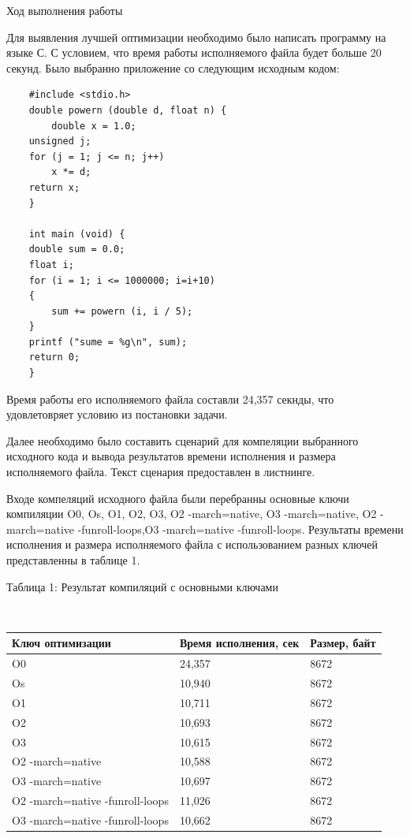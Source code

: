\documentclass[12pt,a4paper]{scrartcl}
\begin{document}
\newpage
\begin{center}
    {\LARGE Ход выполнения работы}
\end{center}
\par
Для выявления лучшей оптимизации необходимо было написать программу на языке С.
 С условием, что время работы исполняемого файла будет больше 20 секунд.
Было выбранно приложение со следующим исходным кодом:

\begin{verbatim}
    #include <stdio.h>
    double powern (double d, float n) {
        double x = 1.0;
	unsigned j;
	for (j = 1; j <= n; j++)
	    x *= d;
	return x;
    }

    int main (void) {
	double sum = 0.0;
	float i;
	for (i = 1; i <= 1000000; i=i+10)
	{
	    sum += powern (i, i / 5);
	}
	printf ("sume = %g\n", sum);
	return 0;
    }
\end{verbatim}
Время работы его исполняемого файла составли 24,357 секнды, что удовлетовряет условию из постановки задачи.
\par
Далее необходимо было составить сценарий для компеляции выбранного исходного кода и вывода результатов
 времени исполнения и размера исполняемого файла. Текст сценария предоставлен в листнинге.
\par 
Входе компеляций исходного файла были перебранны основные ключи компиляции O0, Os, O1, O2, O3, 
O2 -march=native, O3 -march=native, O2 -march=native -funroll-loops,O3 -march=native -funroll-loops.
Результаты времени исполнения и размера исполняемого файла с использованием разных ключей
 представленны в таблице 1.
\newpage
\begin{center}
\caption{Таблица 1: Результат компиляций с основными ключами}\\
\begin{tabular}{| l | l | l |}
\hline
Ключ оптимизации & Время исполнения, сек & Размер, байт  \\ \hline
O0 & 24,357 & 8672\\
Os & 10,940 & 8672\\
O1 & 10,711 & 8672\\
O2 & 10,693 & 8672\\
O3 & 10,615 & 8672\\
O2 -march=native&	10,588&	8672\\
O3 -march=native &	10,697	&8672\\
O2 -march=native -funroll-loops&	11,026	&8672\\
O3 -march=native -funroll-loops&	10,662	&8672\\
\hline
\end{tabular}\\
\end{center}
\end{document}
